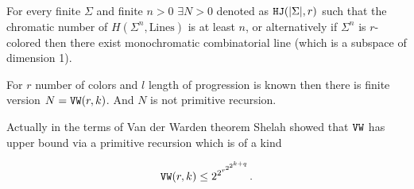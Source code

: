 \begin{thm}
	For every finite $\Sigma$ and finite $n > 0$ $\exists N > 0$ denoted as $\mathtt{HJ} (|\Sigma|, r)$ such that the chromatic number of $H(\Sigma^n, \text{Lines})$ is at least $n$, or alternatively if $\Sigma^n$ is $r$-colored then there exist monochromatic combinatorial line (which is a subspace of dimension 1).
\end{thm}

\begin{thm}
	For $r$ number of colors and $l$ length of progression is known then there is finite version $N = \mathtt{VW}(r,k)$. And $N$ is not primitive recursion.
\end{thm}

Actually in the terms of Van der Warden theorem Shelah showed that $\mathtt{VW}$ has upper bound via a primitive recursion which is of a kind

$$
\mathtt{VW} (r,k) \leq 2^{2^{r^{2^{2^{k+q}}}}}.
$$

\newpage


